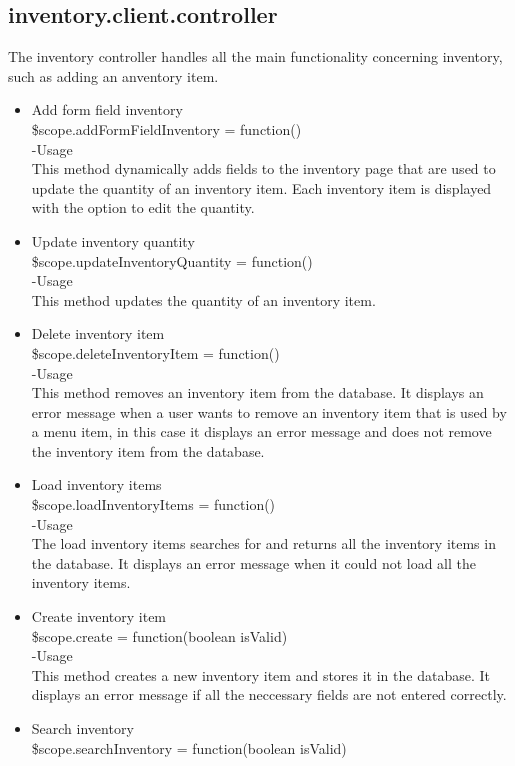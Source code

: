 \documentclass[a4paper,12pt]{article}
\begin{document}
 \subsection{inventory.client.controller}
 The inventory controller handles all the main functionality concerning inventory, such as adding an anventory item.
 \begin{itemize}
 \item Add form field inventory\\
  \$scope.addFormFieldInventory = function()\\
  -Usage\\
  This method dynamically adds fields to the inventory page that are used to update the quantity of an inventory item. Each inventory item is displayed with the option to edit the quantity.
\item  Update inventory quantity\\
 \$scope.updateInventoryQuantity = function()\\
 -Usage\\
 This method updates the quantity of an inventory item.
 \item Delete inventory item\\
  \$scope.deleteInventoryItem = function()\\
  -Usage\\
  This method removes an inventory item from the database. It displays an error message when a user wants to remove an inventory item that is used by a menu item, in this case it displays an error message and does not remove the inventory item from the database.
  \item Load inventory items\\
   \$scope.loadInventoryItems = function()\\
   -Usage\\
   The load inventory items searches for and returns all the inventory items in the database. It displays an error message when it could not load all the inventory items.
   \item Create inventory item\\
    \$scope.create = function(boolean isValid)\\
    -Usage\\
    This method creates a new inventory item and stores it in the database. It displays an error message if all the neccessary fields are not entered correctly. 
    \item Search inventory\\
     \$scope.searchInventory = function(boolean isValid)\\

\end{itemize}
\end{document}
